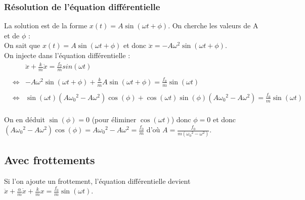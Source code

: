 \documentclass[a4paper,10pt]{book}
\begin{document}
\subsubsection{Résolution de l'équation différentielle}
La solution est de la forme $x(t)=A\sin(\omega t+\phi)$. On cherche les valeurs de A et de $\phi$ :\\

On sait que $x(t)=A\sin(\omega t+\phi)$ et donc $\ddot{x}=-A\omega^{2}\sin(\omega t+\phi)$.\\

On injecte dans l'équation différentielle :\\
 
$\begin{array}{rcl} &&\ddot{x}+\frac{k}{m}\dot{x}=\frac{f_{0}}{m}sin(\omega t)\\\\
&\Leftrightarrow&-A\omega^{2}\sin(\omega t+\phi)+\frac{k}{m}A\sin(\omega t+\phi)=\frac{f_{0}}{m}\sin(\omega t)\\\\
&\Leftrightarrow& \sin(\omega t)(A\omega_{0}{}^{2}-A\omega^{2})\cos(\phi)+\cos(\omega t)\sin(\phi)(A\omega_{0}{}^{2}-A\omega^{2})=\frac{f_{0}}{m}\sin(\omega t)\end{array}$\\\\

On en déduit $\sin(\phi)=0$ (pour éliminer $\cos(\omega t)$) donc $\phi=0$ et donc\\
$(A\omega_{0}{}^{2}-A\omega^{2})\cos(\phi)=A\omega_{0}{}^{2}-A\omega^{2}=\frac{f_{0}}{m}$ d'où $A=\frac{f_{0}}{m(\omega_{0}{}^{2}-\omega^{2})}$.\\

\begin{center}  \end{center}

\newpage

\subsection{Avec frottements}
Si l'on ajoute un frottement, l'équation différentielle devient $\ddot{x}+\frac{\alpha}{m}\dot{x}+\frac{k}{m}x=\frac{f_{0}}{m}\sin(\omega t)$.\\
\end{document}
